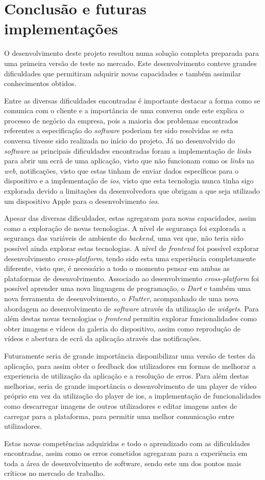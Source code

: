 \chapter{Conclusão e futuras implementações}

O desenvolvimento deste projeto resultou numa solução completa preparada para uma primeira versão de teste no mercado. Este desenvolvimento conteve grandes dificuldades que permitiram adquirir novas capacidades e também assimilar conhecimentos obtidos.

Entre as diversas dificuldades encontradas é importante destacar a forma como se comunica com o cliente e a importância de uma conversa onde este explica o processo de negócio da empresa, pois a maioria dos problemas encontrados referentes a especificação do \textit{software} poderiam ter sido resolvidas se esta conversa tivesse sido realizada no início do projeto. Já no desenvolvido do \textit{software} as principais dificuldades encontradas foram a implementação de \textit{links} para abrir um ecrã de uma aplicação, visto que não funcionam como os \textit{links} na \textit{web}, notificações, visto que estas tinham de enviar dados específicos para o dispositivo e a implementação de \textit{ios}, visto que esta tecnologia nunca tinha sigo explorada devido a limitações da desenvolvedora que obrigam a que seja utilizado um dispositivo Apple para o desenvolvimento \textit{ios}.

Apesar das diversas dificuldades, estas agregaram para novas capacidades, assim como a exploração de novas tecnologias. A nível de segurança foi explorada a segurança das variáveis de ambiente do \textit{backend}, uma vez que, não teria sido possível ainda explorar estas tecnologias. A nível de \textit{frontend} foi possível explorar desenvolvimento \textit{cross-platform}, tendo sido esta uma experiência completamente diferente, visto que, é necessário a todo o momento pensar em ambas as plataformas de desenvolvimento. Associado ao desenvolvimento \textit{cross-platform} foi possível aprender uma nova linguagem de programação, o \textit{Dart} e também uma nova ferramenta de desenvolvimento, o \textit{Flutter}, acompanhado de uma nova abordagem ao desenvolvimento de \textit{software} através da utilização de \textit{widgets}. Para além destas novas tecnologias o \textit{frontend} permitiu explorar funcionalidades como obter imagens e vídeos da galeria do dispositivo, assim como reprodução de vídeos e abertura de ecrã da aplicação através das notificações.

Futuramente seria de grande importância disponibilizar uma versão de testes da aplicação, para assim obter o feedback dos utilizadores em formas de melhorar a experiencia de utilização da aplicação e a resolução de erros. Para além destas melhorias, seria de grande importância o desenvolvimento de um player de vídeo próprio em vez da utilização do player de ios, a implementação de funcionalidades como descarregar imagens de outros utilizadores e editar imagens antes de carregar para a plataforma, para permitir uma melhor comunicação entre utilizadores. 

Estas novas competências adquiridas e todo o aprendizado com as dificuldades encontradas, assim como os erros cometidos agregaram para a experiência em toda a área de desenvolvimento de software, sendo este um dos pontos mais críticos no mercado de trabalho.


